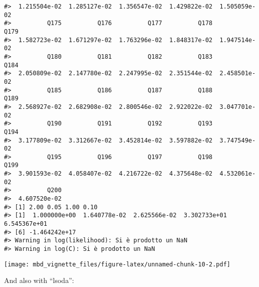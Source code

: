\documentclass[]{article}
\begin{document}
\begin{verbatim}
#>  1.215504e-02  1.285127e-02  1.356547e-02  1.429822e-02  1.505059e-02 
#>          Q175          Q176          Q177          Q178          Q179 
#>  1.582723e-02  1.671297e-02  1.763296e-02  1.848317e-02  1.947514e-02 
#>          Q180          Q181          Q182          Q183          Q184 
#>  2.050809e-02  2.147780e-02  2.247995e-02  2.351544e-02  2.458501e-02 
#>          Q185          Q186          Q187          Q188          Q189 
#>  2.568927e-02  2.682908e-02  2.800546e-02  2.922022e-02  3.047701e-02 
#>          Q190          Q191          Q192          Q193          Q194 
#>  3.177809e-02  3.312667e-02  3.452814e-02  3.597882e-02  3.747549e-02 
#>          Q195          Q196          Q197          Q198          Q199 
#>  3.901593e-02  4.058407e-02  4.216722e-02  4.375648e-02  4.532061e-02 
#>          Q200 
#>  4.607520e-02
#> [1] 2.00 0.05 1.00 0.10
#> [1]  1.000000e+00  1.640778e-02  2.625566e-02  3.302733e+01  6.545367e+01
#> [6] -1.464242e+17
#> Warning in log(likelihood): Si è prodotto un NaN
#> Warning in log(C): Si è prodotto un NaN
\end{verbatim}

\texttt{[image: mbd\_vignette\_files/figure-latex/unnamed-chunk-10-2.pdf]}

And also with ``lsoda'':
\end{document}
